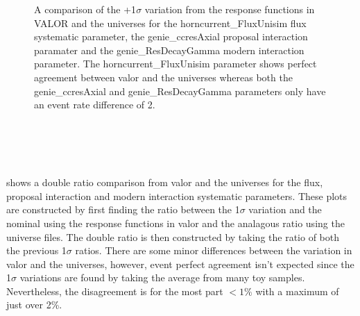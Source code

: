\begin{figure}[h!]
  \captionsetup{width=0.49\textwidth}
  \parbox[b]{0.49\textwidth}%
  {
   \caption[+1$\sigma$ variation comparison for the horncurrent\_FluxUnisim, genie\_ccresAxial and genie\_ResDecayGamma parameters.]{A comparison of the +1$\sigma$ variation from the response functions in VALOR and the universes for the horncurrent\_FluxUnisim flux systematic parameter, the genie\_ccresAxial proposal interaction paramater and the genie\_ResDecayGamma modern interaction parameter. The horncurrent\_FluxUnisim parameter shows perfect agreement between \gls{valor} and the universes whereas both the genie\_ccresAxial and genie\_ResDecayGamma parameters only have an event rate difference of 2. \\\\\\\\\\}
   \label{fig:+1sigma_variations}}
\end{figure}

 shows a double ratio comparison from \gls{valor} and the universes for the flux, proposal interaction and modern interaction systematic parameters. These plots are constructed by first finding the ratio between the 1$\sigma$ variation and the nominal using the response functions in \gls{valor} and the analagous ratio using the universe files. The double ratio is then constructed by taking the ratio of both the previous 1$\sigma$ ratios. There are some minor differences between the variation in \gls{valor} and the universes, however, event perfect agreement isn't expected since the 1$\sigma$ variations are found by taking the average from many toy samples. Nevertheless, the disagreement is for the most part $< 1\%$ with a maximum of just over 2\%. 


